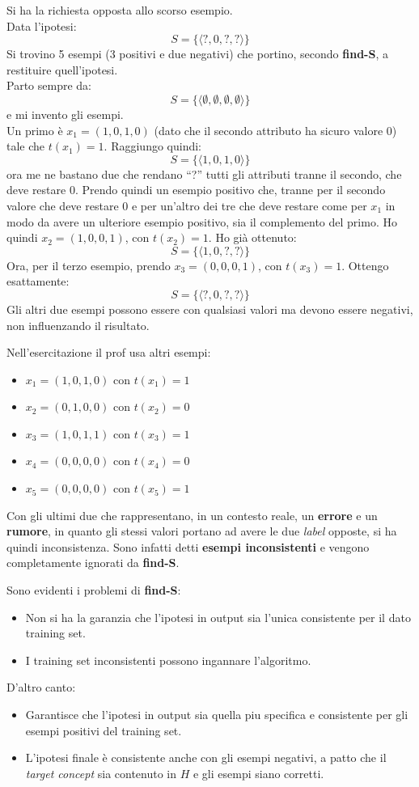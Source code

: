 \begin{esempio}
  Si ha la richiesta opposta allo scorso esempio. \\
  Data l'ipotesi:
  \[S=\{\langle ?,0,?,?\rangle\}\]
  Si trovino 5 esempi (3 positivi e due negativi) che portino, secondo
  \textbf{find-S}, a restituire quell'ipotesi.\\
  Parto sempre da:
  \[S=\{\langle\emptyset,\emptyset,\emptyset,\emptyset\rangle\}\]
  e mi invento gli esempi.\\
  Un primo è $x_1=(1,0,1,0)$ (dato che il secondo attributo ha sicuro valore 0)
  tale che $t(x_1)=1$. Raggiungo quindi: 
  \[S=\{\langle 1,0,1,0\rangle\}\]
  ora me ne bastano due che rendano ``?'' tutti gli attributi tranne il secondo,
  che deve restare 0. Prendo quindi un esempio positivo che, tranne per il secondo
  valore che deve restare 0 e per un'altro dei tre che deve restare come per
  $x_1$ in modo da avere un ulteriore esempio positivo, sia il complemento del
  primo. Ho quindi $x_2=(1,0,0,1)$, con 
  $t(x_2)=1$. Ho già ottenuto:
  \[S=\{\langle 1,0,?,?\rangle\}\]
  Ora, per il terzo esempio, prendo $x_3=(0,0,0,1)$, con $t(x_3)=1$. Ottengo
  esattamente:
  \[S=\{\langle ?,0,?,?\rangle\}\]
  Gli altri due esempi possono essere con qualsiasi valori ma devono essere
  negativi, non influenzando il risultato.\\
  \begin{shaded}
    Nell'esercitazione il prof usa altri esempi:
    \begin{itemize}
      \item $x_1=(1,0,1,0)$ con $t(x_1)=1$
      \item $x_2=(0,1,0,0)$ con $t(x_2)=0$
      \item $x_3=(1,0,1,1)$ con $t(x_3)=1$
      \item $x_4=(0,0,0,0)$ con $t(x_4)=0$
      \item $x_5=(0,0,0,0)$ con $t(x_5)=1$
    \end{itemize}
    Con gli ultimi due che rappresentano, in un contesto reale,
    un \textbf{errore} e un \textbf{rumore}, in quanto gli stessi valori portano
    ad avere le due \textit{label} opposte, si ha quindi inconsistenza. Sono
    infatti detti \textbf{esempi inconsistenti} e vengono completamente ignorati
    da \textbf{find-S}.
  \end{shaded}
\end{esempio}
Sono evidenti i problemi di \textbf{find-S}:
\begin{itemize}
  \item Non si ha la garanzia che l'ipotesi in output sia l'unica consistente per il dato training set.
  \item I training set inconsistenti possono ingannare l'algoritmo.
\end{itemize}
D'altro canto:
\begin{itemize}
  \item Garantisce che l'ipotesi in output sia quella piu specifica
  e consistente per gli esempi positivi del training set.
  \item L'ipotesi finale è consistente anche con gli esempi negativi, a patto
  che il \textit{target concept} sia contenuto in $H$ e gli esempi siano
  corretti.
\end{itemize}
